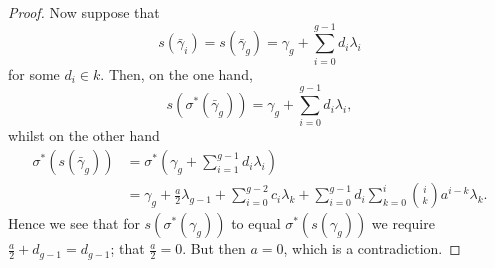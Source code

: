 \begin{proof}
    Now suppose that 
        \[
        s(\bar\gamma_i)  = s( \bar \gamma_g) = \gamma_g + \sum_{i=0}^{g-1}d_i \lambda_i
        \]
    for some $d_i \in k$.
    Then, on the one hand,
        \[
        s(\sigma^*(\bar\gamma_g)) = \gamma_g + \sum_{i=0}^{g-1}d_i\lambda_i,
        \]
    whilst on the other hand
        \begin{align}
        \sigma^*(s(\bar\gamma_g)) & = \sigma^*(\gamma_g + \sum_{i=1}^{g-1} d_i\lambda_i ) \\
        & = \gamma_g + \frac{a}{2}\lambda_{g-1} + \sum_{i=0}^{g-2} c_i \lambda_k + \sum_{i=0}^{g-1} d_i \sum_{k=0}^{i} \binom{i}{k}a^{i-k}\lambda_k.
        \end{align}
    Hence we see that for $s(\sigma^*(\gamma_g))$ to equal $\sigma^*(s(\gamma_g))$ we require $\frac{a}{2} + d_{g-1} = d_{g-1}$; \ie that $\frac{a}{2} = 0$. 
    But then $a=0$, which is a contradiction.
    \end{proof}



